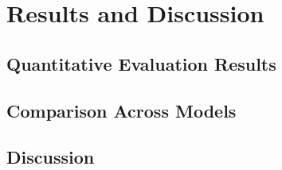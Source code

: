 \clearpage

\chapter{Results and Discussion}

\section{Quantitative Evaluation Results}
\section{Comparison Across Models}
\section{Discussion}

\newpage
